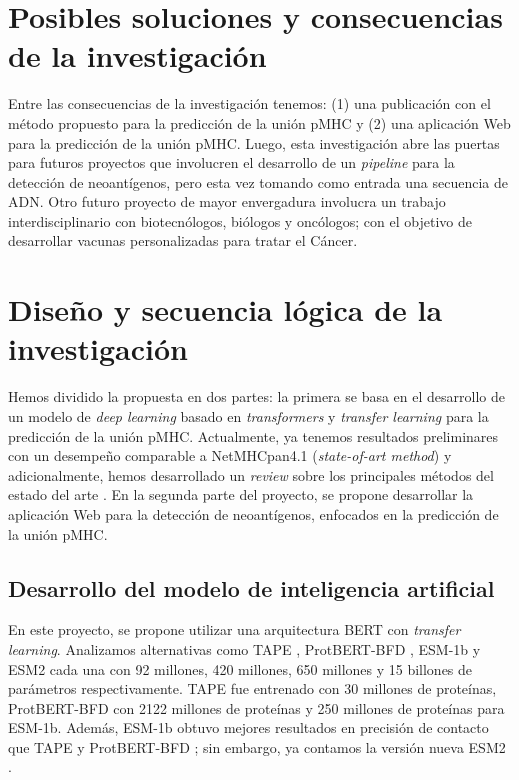 \documentclass[a4paper]{article}
\begin{document}
\section{Posibles soluciones y consecuencias de la investigación}

Entre las consecuencias de la investigación tenemos: (1) una publicación con el método propuesto para la predicción de la unión pMHC y (2) una aplicación Web para la predicción de la unión pMHC. Luego, esta investigación abre las puertas para futuros proyectos que involucren el desarrollo de un \textit{pipeline} para la detección de neoantígenos, pero esta vez tomando como entrada una secuencia de ADN. Otro futuro proyecto de mayor envergadura involucra un trabajo interdisciplinario con biotecnólogos, biólogos y oncólogos; con el objetivo de desarrollar vacunas personalizadas para tratar el Cáncer. 

\section{Diseño y secuencia lógica de la investigación} 

Hemos dividido la propuesta en dos partes: la primera se basa en el desarrollo de un modelo de \textit{deep learning} basado en \textit{transformers} y \textit{transfer learning} para la predicción de la unión pMHC. Actualmente, ya tenemos resultados preliminares con un desempeño comparable a NetMHCpan4.1 (\textit{state-of-art method}) \citep{arceda2023neoantigen} y adicionalmente, hemos desarrollado un \textit{review} sobre los principales métodos del estado del arte \citep{machaca2023deep}. En la segunda parte del proyecto, se propone desarrollar la aplicación Web para la detección de neoantígenos, enfocados en la predicción de la unión pMHC.

\subsection{Desarrollo del modelo de inteligencia artificial}

En este proyecto, se propone utilizar una arquitectura BERT con \textit{transfer learning}. Analizamos alternativas como TAPE \citep{rao2019evaluating}, ProtBERT-BFD \citep{elnaggar2021prottrans}, ESM-1b \citep{rives2021biological} y ESM2 \citep{lin2023evolutionary} cada una con 92 millones, 420 millones, 650 millones y 15 billones de parámetros respectivamente. TAPE fue entrenado con 30 millones de proteínas, ProtBERT-BFD con 2122 millones de proteínas y 250 millones de proteínas para ESM-1b. Además, ESM-1b obtuvo mejores resultados en precisión de contacto que TAPE y ProtBERT-BFD \citep{rives2021biological}; sin embargo, ya contamos la versión nueva ESM2 \citep{lin2023evolutionary}.\\
\end{document}
